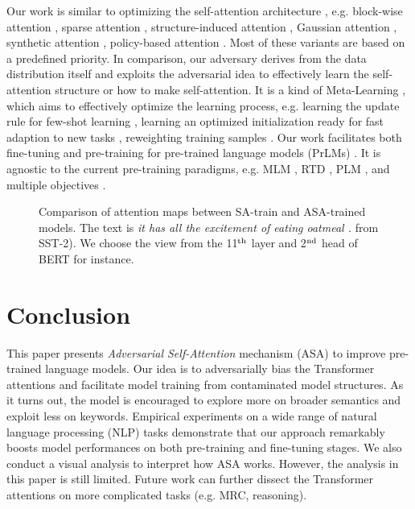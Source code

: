 \documentclass[letterpaper]{article} \usepackage{aaai23}  \usepackage{times}  \usepackage{helvet}  \usepackage{courier}  \usepackage[hyphens]{url}  \usepackage{graphicx} \urlstyle{rm} \def\UrlFont{\rm}  \usepackage{natbib}  \usepackage{caption} \frenchspacing  \setlength{\pdfpagewidth}{8.5in}  \setlength{\pdfpageheight}{11in}  \usepackage{algorithm}
\begin{document}
Our work is similar to optimizing the self-attention architecture \citep{DBLP:conf/nips/VaswaniSPUJGKP17}, e.g. block-wise attention \citep{DBLP:conf/nips/ZaheerGDAAOPRWY20}, sparse attention \citep{DBLP:conf/icml/ShiGRXLLK21}, structure-induced attention \citep{DBLP:conf/acl/WuZZ21}, Gaussian attention \citep{DBLP:conf/acl/YouSI20}, synthetic attention \citep{DBLP:conf/icml/TayBMJZZ21}, policy-based attention \citep{DBLP:journals/corr/abs-2104-04692}. Most of these variants are based on a predefined priority. In comparison, our adversary derives from the data distribution itself and exploits the adversarial idea to effectively learn the self-attention structure or how to make self-attention. It is a kind of Meta-Learning \citep{DBLP:books/sp/98/ThrunP98}, which aims to effectively optimize the learning process, e.g. learning the update rule for few-shot learning \citep{DBLP:conf/iclr/RaviL17}, learning an optimized initialization ready for fast adaption to new tasks \citep{DBLP:conf/icml/FinnAL17}, reweighting training samples \citep{DBLP:conf/icml/RenZYU18}. Our work facilitates both fine-tuning and pre-training for pre-trained language models (PrLMs) \citep{DBLP:conf/naacl/DevlinCLT19,DBLP:journals/corr/abs-1907-11692,DBLP:journals/jmlr/RaffelSRLNMZLL20,DBLP:conf/iclr/HeLGC21}. It is agnostic to the current pre-training paradigms, e.g. MLM \citep{DBLP:conf/naacl/DevlinCLT19}, RTD \citep{DBLP:conf/iclr/ClarkLLM20}, PLM \citep{DBLP:conf/nips/YangDYCSL19}, and multiple objectives \citep{DBLP:journals/corr/abs-2210-10293}.

\begin{figure}
\centering
{}
\caption{Comparison of attention maps between SA-train and ASA-trained models. The text is \textit{it has all the excitement of eating oatmeal .} from SST-2). We choose the view from the 11$^{\rm th}$ layer and 2$^{\rm nd}$ head of BERT for instance.}
\label{f10}
\end{figure}


\section{Conclusion}

This paper presents \textit{Adversarial Self-Attention} mechanism (ASA) to improve pre-trained language models. Our idea is to adversarially bias the Transformer attentions and facilitate model training from contaminated model structures. As it turns out, the model is encouraged to explore more on broader semantics and exploit less on keywords. Empirical experiments on a wide range of natural language processing (NLP) tasks demonstrate that our approach remarkably boosts model performances on both pre-training and fine-tuning stages. We also conduct a visual analysis to interpret how ASA works. However, the analysis in this paper is still limited. Future work can further dissect the Transformer attentions on more complicated tasks (e.g. MRC, reasoning).
\end{document}
